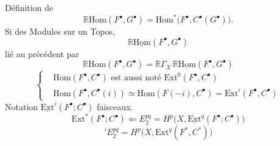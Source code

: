 \documentclass[11pt,a4paper]{article}
\begin{document}
Définition de
\[
  \mathbb{R}\mathrm{Hom}(F^{\bullet}, G^{\bullet}) = \mathrm{Hom}^*\bigl(F^{\bullet}, C^{\bullet}(G^{\bullet})\bigr) .
\]
\struck{\ill{}} Si \ill{} \ill{} des Modules sur un Topos,
\[
  \mathbb{R}\underline{\mathrm{Hom}}(F^{\bullet}, G^{\bullet})
\]
lié au précédent par
\[
  \boxed{\ \mathbb{R}\mathrm{Hom}(F^{\bullet}, G^{\bullet})
  = \mathbb{R}\Gamma_X\, \mathbb{R}\underline{\mathrm{Hom}}(F^{\bullet}, G^{\bullet})\ }
\]
\[
  \left\{
  \begin{aligned}
    &\mathrm{Hom}(F^{\bullet}, C^{\bullet}) \text{ est aussi noté } \mathrm{Ext}^0(F^{\bullet}, C^{\bullet})\\
    &\mathrm{Hom}(F^{\bullet}, C^{\bullet}(i)) \simeq \mathrm{Hom}(F(-i), C^{\bullet}) = \mathrm{Ext}^i(F^{\bullet}, C^{\bullet})
  \end{aligned}
  \right.
\]
Notation $\underline{\mathrm{Ext}}^i(F^{\bullet}; C^{\bullet})$ faisceaux.
\[
  \mathrm{Ext}^*(F^{\bullet}; C^{\bullet}) \Longleftarrow
  E_2^{pq} = H^p\bigl(X, \underline{\mathrm{Ext}}^q(F^{\bullet}; C^{\bullet})\bigr)
\]
\[
  {}'E_2^{pq} = H^p\bigl(X, \mathrm{Ext}^q(F^*, C^*)\bigr)
\]
\end{document}
